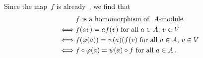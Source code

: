 \addtocounter{subsection}{2}
\subsection{}

Since the map~$f$ is already~{\klin}, we find that
\begin{align*}
      &{} \text{$f$ is a homomorphism of~{\module{$A$}}} \\
  \iff&{} \text{$f(av) = af(v)$ for all~$a \in A$,~$v \in V$} \\
  \iff&{} \text{$f(\varphi(a)) = \psi(a)(f(v)$ for all~$a \in A$,~$v \in V$}  \\
  \iff&{} \text{$f \circ \varphi(a) = \psi(a) \circ f$ for all~$a \in A$} \,.
\end{align*}




